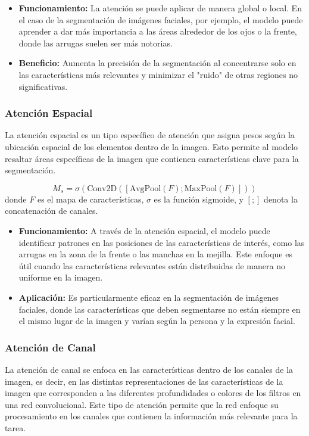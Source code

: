 \begin{itemize}
    \item \textbf{Funcionamiento:} La atención se puede aplicar de manera global o local. En el caso de la segmentación de imágenes faciales, por ejemplo, el modelo puede aprender a dar más importancia a las áreas alrededor de los ojos o la frente, donde las arrugas suelen ser más notorias. \parencite{autor2021atencion}
    \item \textbf{Beneficio:} Aumenta la precisión de la segmentación al concentrarse solo en las características más relevantes y minimizar el "ruido" de otras regiones no significativas. \parencite{autor2021atencion}
\end{itemize}

\subsubsection{Atención Espacial}  
La atención espacial es un tipo específico de atención que asigna pesos según la ubicación espacial de los elementos dentro de la imagen. Esto permite al modelo resaltar áreas específicas de la imagen que contienen características clave para la segmentación. \parencite{autor2020spa}

\begin{equation}\label{eq:mapa_atencion_espacial}
    M_s = \sigma(\text{Conv2D}([\text{AvgPool}(F); \text{MaxPool}(F)]))
\end{equation}
donde $F$ es el mapa de características, $\sigma$ es la función sigmoide, y $[;]$ denota la concatenación de canales.


\begin{itemize}
    \item \textbf{Funcionamiento:} A través de la atención espacial, el modelo puede identificar patrones en las posiciones de las características de interés, como las arrugas en la zona de la frente o las manchas en la mejilla. Este enfoque es útil cuando las características relevantes están distribuidas de manera no uniforme en la imagen. \parencite{autor2020spa}
    \item \textbf{Aplicación:} Es particularmente eficaz en la segmentación de imágenes faciales, donde las características que deben segmentarse no están siempre en el mismo lugar de la imagen y varían según la persona y la expresión facial. \parencite{autor2020spa}
\end{itemize}

\subsubsection{Atención de Canal}  
La atención de canal se enfoca en las características dentro de los canales de la imagen, es decir, en las distintas representaciones de las características de la imagen que corresponden a las diferentes profundidades o colores de los filtros en una red convolucional. Este tipo de atención permite que la red enfoque su procesamiento en los canales que contienen la información más relevante para la tarea. \parencite{autor2019canal} 

